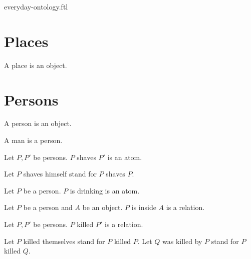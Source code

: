 \documentclass{stex}
\begin{document}
\begin{smodule}{everyday-ontology.ftl}

  \section*{Places}

  \begin{fsignature*}
    A place is an object.
  \end{fsignature*}


  \section*{Persons}

  \begin{fsignature*}
    A person is an object.
  \end{fsignature*}

  \begin{fsignature*}
    A man is a person.
  \end{fsignature*}

  \begin{fsignature*}
    Let $P, P'$ be persons.
    $P$ shaves $P'$ is an atom.
  \end{fsignature*}

  \begin{fconvention*}
    Let $P$ shaves himself stand for $P$ shaves $P$.
  \end{fconvention*}

  \begin{fsignature*}
    Let $P$ be a person.
    $P$ is drinking is an atom.
  \end{fsignature*}

  \begin{fsignature*}
    Let $P$ be a person and $A$ be an object.
    $P$ is inside $A$ is a relation.
  \end{fsignature*}

  \begin{fsignature*}
    Let $P, P'$ be persons.
    $P$ killed $P'$ is a relation.
  \end{fsignature*}

  \begin{fconvention*}
    Let $P$ killed themselves stand for $P$ killed $P$.
    Let $Q$ was killed by $P$ stand for $P$ killed $Q$.
  \end{fconvention*}


\end{smodule}
\end{document}
